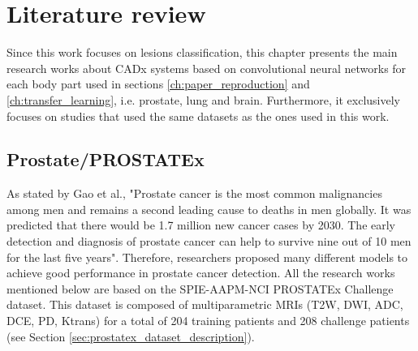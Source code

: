 
\chapter{Literature review}
\label{ch:literature_review}

\setlength{\marginparwidth}{3cm}\leavevmode {}Since this work focuses on lesions classification, this chapter presents the main research works about CADx systems based on convolutional neural networks for each body part used in sections \ref{ch:paper_reproduction} and \ref{ch:transfer_learning}, i.e. prostate, lung and brain. Furthermore, it exclusively focuses on studies that used the same datasets as the ones used in this work.

\section{Prostate/PROSTATEx}

\setlength{\marginparwidth}{3cm}\leavevmode {}As stated by Gao et al., "Prostate  cancer  is  the  most  common  malignancies  among  men  and  remains  a  second  leading  cause to deaths in men globally. It was predicted that there would be 1.7 million new cancer cases by 2030. The early detection and diagnosis of prostate cancer can help to survive nine out of 10 men for the last five years"\cite{41}. Therefore, researchers proposed many different models to achieve good performance in prostate cancer detection. All the research works mentioned below are based on the SPIE-AAPM-NCI PROSTATEx Challenge dataset. This dataset is composed of multiparametric MRIs (T2W, DWI, ADC, DCE, PD, Ktrans) for a total of 204 training patients and 208 challenge patients (see Section \ref{sec:prostatex_dataset_description}).


